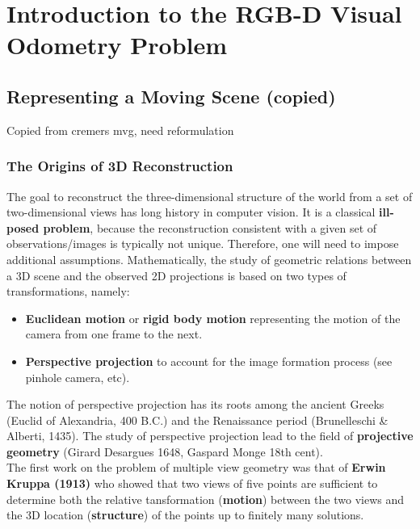 \chapter{Introduction to the RGB-D Visual Odometry Problem}%
\label{cha:rgbd_vo}

\minitoc%
\clearpage

\section{Representing a Moving Scene (copied)}%
\label{sec:moving-scene}

\alert{Copied from cremers mvg, need reformulation}

\subsection{The Origins of 3D Reconstruction}%
\label{sub:the_origins_of_3d_reconstruction}

The goal to reconstruct the three-dimensional structure of the world from
a set of two-dimensional views has long history in computer vision.
It is a classical \textbf{ill-posed problem}, because the reconstruction
consistent with a given set of observations/images is typically not unique.
Therefore, one will need to impose additional assumptions.
Mathematically, the study of geometric relations between a 3D scene
and the observed 2D projections is based on two types of transformations, namely:
\begin{itemize}
	\item \textbf{Euclidean motion} or \textbf{rigid body motion}
		representing the motion of the camera from one frame to the next.
	\item \textbf{Perspective projection} to account for the image formation
		process (see pinhole camera, etc).
\end{itemize}

The notion of perspective projection has its roots among the ancient Greeks
(Euclid of Alexandria, \roughly{} 400 B.C.) and the Renaissance period
(Brunelleschi \& Alberti, 1435).
The study of perspective projection lead to the field of
\textbf{projective geometry} (Girard Desargues 1648, Gaspard Monge 18th cent).\\

The first work on the problem of multiple view geometry was that of
\textbf{Erwin Kruppa (1913)} who showed that two views of five points
are sufficient to determine both the relative tansformation
(\textbf{motion}) between the two views and the 3D location (\textbf{structure})
of the points up to finitely many solutions.\\

